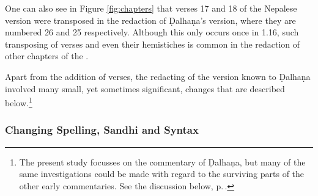 One can also see in Figure \ref{fig:chapters} that verses 17 and 18 of the
Nepalese version were transposed in the redaction of Ḍalhaṇa's version, where
they are numbered 26 and 25 respectively. Although this only occurs once in 1.16,
such transposing of verses and even their hemistiches is common in the
redaction of other chapters of the \SS.

Apart from the addition of verses, the redacting of the version known to Ḍalhaṇa
involved many small, yet sometimes significant, changes that are described
below.\footnote{The present study focusses on the commentary of Ḍalhaṇa, but many
    of the same investigations could be made with regard to the surviving parts of the
    other early commentaries. See the discussion below, p.\,\pageref{ref:dalhana}.}

\subsubsection{Changing Spelling, Sandhi and Syntax}


